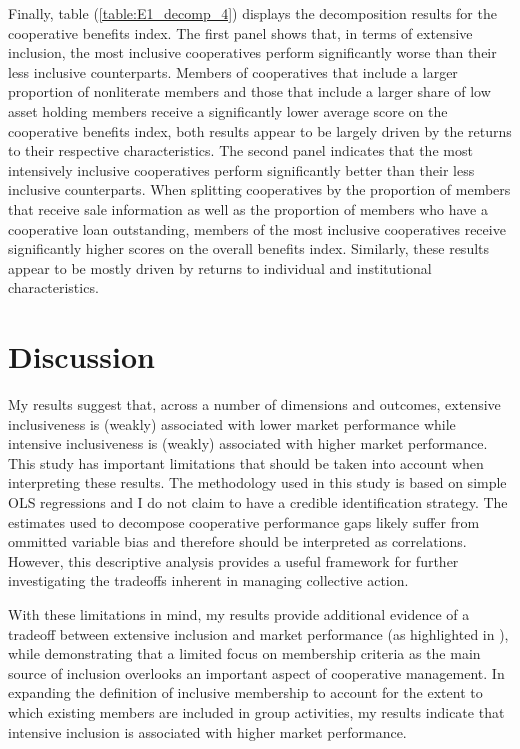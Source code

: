 \documentclass[11pt]{article}
\begin{document}
Finally, table (\ref{table:E1_decomp_4}) displays the decomposition results for the cooperative benefits index. The first panel shows that, in terms of extensive inclusion, the most inclusive cooperatives perform significantly worse than their less inclusive counterparts. Members of cooperatives that include a larger proportion of nonliterate members and those that include a larger share of low asset holding members receive a significantly lower average score on the cooperative benefits index, both results appear to be largely driven by the returns to their respective characteristics. The second panel indicates that the most intensively inclusive cooperatives perform significantly better than their less inclusive counterparts. When splitting cooperatives by the proportion of members that receive sale information as well as the proportion of members who have a cooperative loan outstanding, members of the most inclusive cooperatives receive significantly higher scores on the overall benefits index. Similarly, these results appear to be mostly driven by returns to individual and institutional characteristics. 


\section{Discussion}

My results suggest that, across a number of dimensions and outcomes, extensive inclusiveness is (weakly) associated with lower market performance while intensive inclusiveness is (weakly) associated with higher market performance. This study has important limitations that should be taken into account when interpreting these results. The methodology used in this study is based on simple OLS regressions and I do not claim to have a credible identification strategy. The estimates used to decompose cooperative performance gaps likely suffer from ommitted variable bias and therefore should be interpreted as correlations. However, this descriptive analysis provides a useful framework for further investigating the tradeoffs inherent in managing collective action. 

With these limitations in mind, my results provide additional evidence of a tradeoff between extensive inclusion and market performance (as highlighted in \citet{bernard_reaching_2009}), while demonstrating that a limited focus on membership criteria as the main source of inclusion overlooks an important aspect of cooperative management. In expanding the definition of inclusive membership to account for the extent to which existing members are included in group activities, my results indicate that intensive inclusion is associated with higher market performance. 
\end{document}
